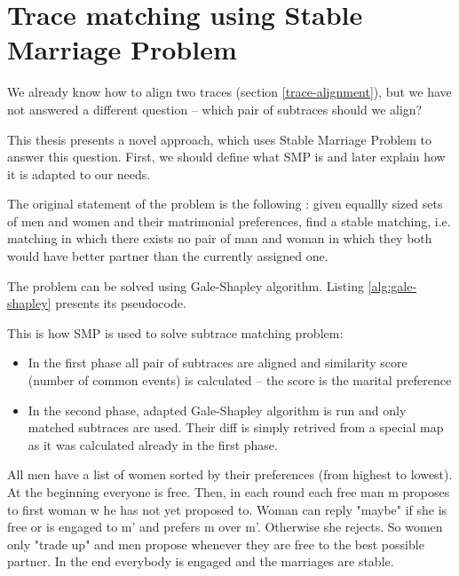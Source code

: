 \section{Trace matching using Stable Marriage Problem}
\label{trace-matching}

We already know how to align two traces (section \ref{trace-alignment}), but we have not
answered a different question -- which pair of subtraces should we align?

This thesis presents a novel approach, which uses Stable Marriage Problem to answer this question.
First, we should define what SMP is and later explain how it is adapted to our needs.

The original statement of the problem is the following \cite{wiki:smp}: 
given equallly sized sets of men and women and their matrimonial preferences,
find a stable matching, i.e. matching in which there exists no pair of man and woman 
in which they both would have better partner than the currently assigned one.

The problem can be solved using Gale-Shapley algorithm. Listing \ref{alg:gale-shapley} presents its pseudocode.



This is how SMP is used to solve subtrace matching problem:
\begin{itemize}
  \item In the first phase all pair of subtraces are aligned and similarity score (number of common events) 
  		    is calculated -- the score is the marital preference
  \item In the second phase, adapted Gale-Shapley algorithm is run and only matched subtraces
           are used. Their diff is simply retrived from a special map as it was calculated already in the first phase.
\end{itemize}

All men have a list of women sorted by their preferences (from highest to lowest).
At the beginning everyone is free. Then, in each round each free man m proposes to first woman w he has not yet proposed to.
Woman can reply "maybe" if she is free or is engaged to m' and prefers m over m'. Otherwise she rejects.
So women only "trade up" and men propose whenever they are free to the best possible partner.
In the end everybody is engaged and the marriages are stable.


